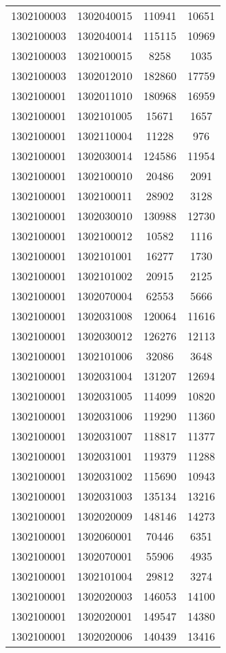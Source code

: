 \begin{longtable}{llcc}
1302100003 & 1302040015 & 110941 & 10651\\
1302100003 & 1302040014 & 115115 & 10969\\
1302100003 & 1302100015 & 8258 & 1035\\
1302100003 & 1302012010 & 182860 & 17759\\
1302100001 & 1302011010 & 180968 & 16959\\
1302100001 & 1302101005 & 15671 & 1657\\
1302100001 & 1302110004 & 11228 & 976\\
1302100001 & 1302030014 & 124586 & 11954\\
1302100001 & 1302100010 & 20486 & 2091\\
1302100001 & 1302100011 & 28902 & 3128\\
1302100001 & 1302030010 & 130988 & 12730\\
1302100001 & 1302100012 & 10582 & 1116\\
1302100001 & 1302101001 & 16277 & 1730\\
1302100001 & 1302101002 & 20915 & 2125\\
1302100001 & 1302070004 & 62553 & 5666\\
1302100001 & 1302031008 & 120064 & 11616\\
1302100001 & 1302030012 & 126276 & 12113\\
1302100001 & 1302101006 & 32086 & 3648\\
1302100001 & 1302031004 & 131207 & 12694\\
1302100001 & 1302031005 & 114099 & 10820\\
1302100001 & 1302031006 & 119290 & 11360\\
1302100001 & 1302031007 & 118817 & 11377\\
1302100001 & 1302031001 & 119379 & 11288\\
1302100001 & 1302031002 & 115690 & 10943\\
1302100001 & 1302031003 & 135134 & 13216\\
1302100001 & 1302020009 & 148146 & 14273\\
1302100001 & 1302060001 & 70446 & 6351\\
1302100001 & 1302070001 & 55906 & 4935\\
1302100001 & 1302101004 & 29812 & 3274\\
1302100001 & 1302020003 & 146053 & 14100\\
1302100001 & 1302020001 & 149547 & 14380\\
1302100001 & 1302020006 & 140439 & 13416\\

\end{longtable}
